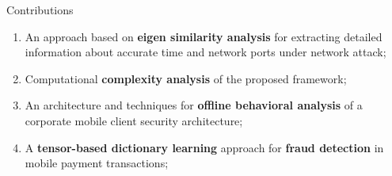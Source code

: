 \documentclass[newPxFont, numfooter, sectionpages]{beamer}
\begin{document}
\begin{frame}{Contributions}
	\begin{enumerate}
		\item An approach based on \textbf{eigen similarity analysis} for extracting detailed information about accurate time and network ports under network attack;
		\item Computational \textbf{complexity analysis} of the proposed framework;
		\item An architecture and techniques for \textbf{offline behavioral analysis} of a corporate mobile client security architecture;
		\item A \textbf{tensor-based dictionary learning} approach for \textbf{fraud detection} in mobile payment transactions;
	\end{enumerate}
\end{frame}


%
%
\end{document}
